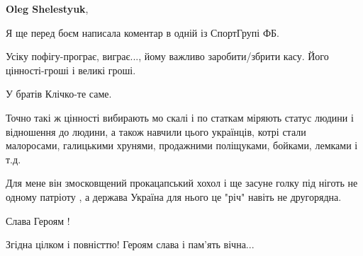 \begin{itemize}
\begin{itemize}
\textbf{Oleg Shelestyuk}, 

Я ще перед боєм написала коментар в одній із СпортГрупі ФБ.

Усіку пофігу-програє, виграє..., йому важливо заробити/збрити касу. Його
цінності-гроші і великі гроші.

У братів Клічко-те саме.

Точно такі ж цінності вибирають мо скалі і по статкам міряють статус людини і
відношення до людини, а також навчили цього українців, котрі стали малоросами,
галицькими хрунями, продажними поліщуками, бойками, лемками і т.д.

\end{itemize} %


Для мене він змосковщений прокацапський хохол і ще засуне голку під ніготь не
одному патріоту , а держава Україна для нього це "річ" навіть не другорядна.

Слава Героям !

Згідна цілком і повністтю! Героям слава і пам'ять вічна...

\end{itemize} %
